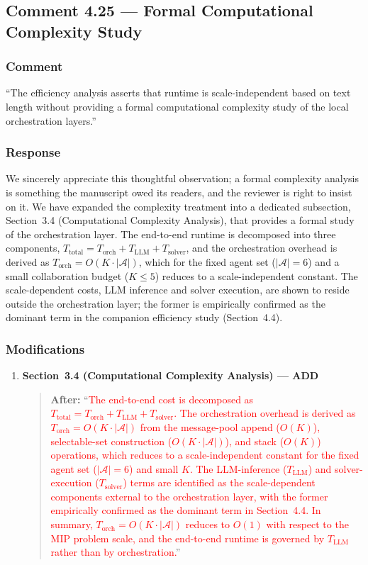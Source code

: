\documentclass[11pt,a4paper]{article}
\begin{document}
\subsection{Comment 4.25 --- Formal Computational Complexity Study}

\subsubsection{Comment}
``The efficiency analysis asserts that runtime is scale-independent based on text length without providing a formal computational complexity study of the local orchestration layers.''

\subsubsection{Response}
We sincerely appreciate this thoughtful observation; a formal complexity analysis is something the manuscript owed its readers, and the reviewer is right to insist on it. We have expanded the complexity treatment into a dedicated subsection, Section~3.4 (Computational Complexity Analysis), that provides a formal study of the orchestration layer. The end-to-end runtime is decomposed into three components, $T_{\text{total}}=T_{\text{orch}}+T_{\text{LLM}}+T_{\text{solver}}$, and the orchestration overhead is derived as $T_{\text{orch}}=O(K\cdot|\mathcal{A}|)$, which for the fixed agent set ($|\mathcal{A}|=6$) and a small collaboration budget ($K\le 5$) reduces to a scale-independent constant. The scale-dependent costs, LLM inference and solver execution, are shown to reside outside the orchestration layer; the former is empirically confirmed as the dominant term in the companion efficiency study (Section~4.4).

\subsubsection{Modifications}
\begin{enumerate}
\item \textbf{Section~3.4 (Computational Complexity Analysis) --- ADD}
\begin{quote}
\textbf{After:} ``\textcolor{red}{The end-to-end cost is decomposed as $T_{\text{total}}=T_{\text{orch}}+T_{\text{LLM}}+T_{\text{solver}}$. The orchestration overhead is derived as $T_{\text{orch}}=O(K\cdot|\mathcal{A}|)$ from the message-pool append ($O(K)$), selectable-set construction ($O(K\cdot|\mathcal{A}|)$), and stack ($O(K)$) operations, which reduces to a scale-independent constant for the fixed agent set ($|\mathcal{A}|=6$) and small $K$. The LLM-inference ($T_{\text{LLM}}$) and solver-execution ($T_{\text{solver}}$) terms are identified as the scale-dependent components external to the orchestration layer, with the former empirically confirmed as the dominant term in Section~4.4. In summary, $T_{\text{orch}}=O(K\cdot|\mathcal{A}|)$ reduces to $O(1)$ with respect to the MIP problem scale, and the end-to-end runtime is governed by $T_{\text{LLM}}$ rather than by orchestration.}''
\end{quote}
\end{enumerate}
\end{document}
